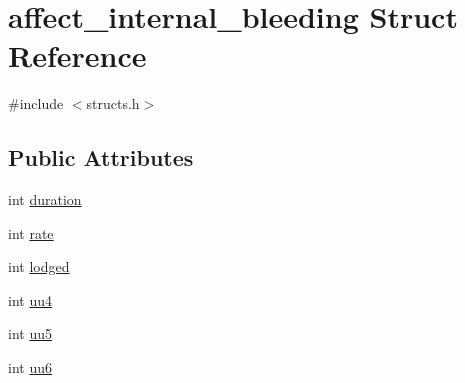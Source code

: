 \hypertarget{structaffect__internal__bleeding}{\section{affect\-\_\-internal\-\_\-bleeding Struct Reference}
\label{structaffect__internal__bleeding}
}


{\ttfamily \#include $<$structs.\-h$>$}

\subsection*{Public Attributes}
\begin{DoxyCompactItemize}
\item 
int \hyperlink{structaffect__internal__bleeding_ac47f6f0789f357e65723951586f16e72}{duration}
\item 
int \hyperlink{structaffect__internal__bleeding_a50546b9b73e9946128293772340d5772}{rate}
\item 
int \hyperlink{structaffect__internal__bleeding_a6364cd4e594140695a5ddb5977061329}{lodged}
\item 
int \hyperlink{structaffect__internal__bleeding_a1fb1f660b7af8e3e038f270bf933967a}{uu4}
\item 
int \hyperlink{structaffect__internal__bleeding_a29bcc0465cb4664ddc088b2d6e9b54f8}{uu5}
\item 
int \hyperlink{structaffect__internal__bleeding_ab9138c48b2d0b5498cf0b803262de54f}{uu6}
\end{DoxyCompactItemize}


